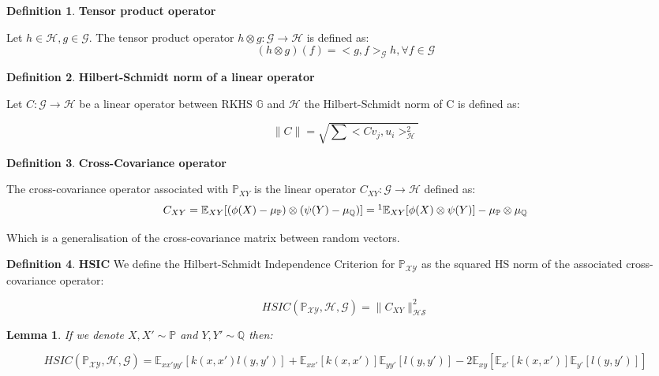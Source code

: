 \documentclass[8pt,a4paper]{article}
\theoremstyle{plain}
\newtheorem{lem}[thm]{Lemma}
\theoremstyle{definition}
\newtheorem{defn}{Definition}[section]
\theoremstyle{remark}
\providecommand{\norm}[1]{\lVert#1\rVert}
\begin{document}
\begin{defn}
\textsf{\textbf{Tensor product operator}}

Let $h \in \mathcal{H},g \in \mathcal{G}$. The tensor product operator $h \otimes g: \mathcal{G}\rightarrow\mathcal{H}$ is defined as:
$$(h \otimes g)(f) = <g,f>_{\mathcal{G}}h, \forall f \in \mathcal{G}$$
\end{defn}
\begin{defn}
\textsf{\textbf{Hilbert-Schmidt norm of a linear operator}}

Let $C:\mathcal{G}\rightarrow\mathcal{H}$ be a linear operator between RKHS $\mathbb{G} $ and $\mathcal{H}$ the Hilbert-Schmidt norm of C is defined as:

$$\norm{C} = \sqrt{\sum{<Cv_{j},u_{i}>^{2}_{\mathcal{H}}}}$$
\end{defn}
\begin{defn}
\textsf{\textbf{Cross-Covariance operator}}

The cross-covariance operator associated with $\mathbb{P}_{XY}$ is the linear operator $C_{XY}:\mathcal{G}\rightarrow\mathcal{H}$ defined as:
$$C_{XY} = \mathbb{E}_{XY}[(\phi(X)-\mu_{\mathbb{P}}) \otimes (\psi(Y) -\mu_{\mathbb{Q}})] =\footnote{distributive property of the tensor product} \mathbb{E}_{XY}[\phi(X) \otimes \psi(Y)] - \mu_{\mathbb{P}} \otimes \mu_{\mathbb{Q}} $$

Which is a generalisation of the cross-covariance matrix between random vectors.
\end{defn}
\begin{defn}
\textsf{\textbf{HSIC}}
We define the Hilbert-Schmidt Independence Criterion for $\mathbb{P}_{\mathcal{X}\mathcal{Y}}$ as the squared HS norm of the associated cross-covariance operator:

$$HSIC(\mathbb{P}_{\mathcal{X}\mathcal{Y}},\mathcal{H},\mathcal{G}) = \norm{C_{XY}}^{2}_{\mathcal{HS}}$$
\end{defn}
\begin{lem}

If we denote $X,X'\sim \mathbb{P}$ and $Y,Y'\sim \mathbb{Q}$ then:

$$HSIC(\mathbb{P}_{\mathcal{X}\mathcal{Y}},\mathcal{H},\mathcal{G}) = \mathbb{E}_{xx'yy'}[k(x,x')l(y,y')] + \mathbb{E}_{xx'}[k(x,x')]\mathbb{E}_{yy'}[l(y,y')] -2\mathbb{E}_{xy}[\mathbb{E}_{x'}[k(x,x')]\mathbb{E}_{y'}[l(y,y')]]$$
\end{lem}
\end{document}
